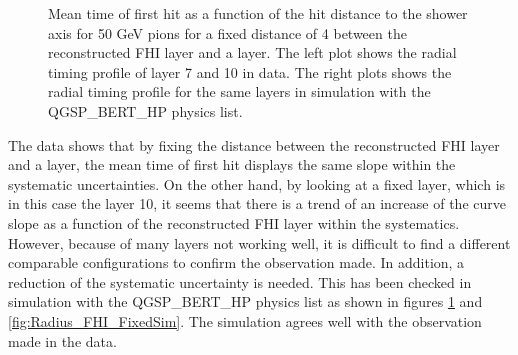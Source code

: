 \begin{figure}[htbp!]
\begin{subfigure}[t]{0.49\textwidth}
		\caption{}\label{fig:Radius_FHISim1}
	\end{subfigure}
	\caption{Mean time of first hit as a function of the hit distance to the shower axis for 50 GeV pions for a fixed distance of 4 between the reconstructed FHI layer and a layer. The left plot shows the radial timing profile of layer 7 and 10 in data. The right plots shows the radial timing profile for the same layers in simulation with the QGSP\_BERT\_HP physics list.}
	\label{fig:Radius_FHIAll}
\end{figure}

The data shows that by fixing the distance between the reconstructed FHI layer and a layer, the mean time of first hit displays the same slope within the systematic uncertainties. On the other hand, by looking at a fixed layer, which is in this case the layer 10, it seems that there is a trend of an increase of the curve slope as a function of the reconstructed FHI layer within the systematics. However, because of many layers not working well, it is difficult to find a different comparable configurations to confirm the observation made. In addition, a reduction of the systematic uncertainty is needed. This has been checked in simulation with the QGSP\_BERT\_HP physics list as shown in figures \ref{fig:Radius_FHISim1} and \ref{fig:Radius_FHI_FixedSim}. The simulation agrees well with the observation made in the data.

